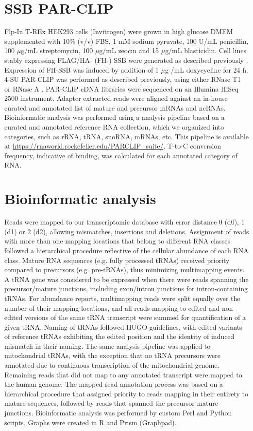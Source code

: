\documentclass[12pt]{rockefeller}
\begin{document}
\section{SSB PAR-CLIP}\label{parclip_method}
Flp-In T-REx HEK293 cells (Invitrogen) were grown in high glucose DMEM supplemented with 10\% (v/v) FBS, 1 mM sodium pyruvate, 100 U/mL penicillin, 100 $\mu$g/mL streptomycin, 100 $\mu$g/mL zeocin and 15 $\mu$g/mL blasticidin. Cell lines stably expressing FLAG/HA- (FH-) SSB were generated as described previously \cite{Spitzer:2013fk}. Expression of FH-SSB was induced by addition of 1 $\mu$g /mL doxycycline for 24 h. 4-SU PAR-CLIP was performed as described previously, using either RNase T1 or RNase A \cite{Garzia:2016cx}. PAR-CLIP cDNA libraries were sequenced on an Illumina HiSeq 2500 instrument. Adapter extracted reads were aligned against an in-house curated and annotated list of mature and precursor mRNAs and ncRNAs. Bioinformatic analysis was performed using a analysis pipeline based on a curated and annotated reference RNA collection, which we organized into categories, such as rRNA, tRNA, snoRNA, mRNAs, etc. This pipeline is available at \url{https://rnaworld.rockefeller.edu/PARCLIP_suite/}. T-to-C conversion frequency, indicative of binding, was calculated for each annotated category of RNA. 

\section{Bioinformatic analysis}
Reads were mapped to our transcriptomic database with error distance 0 (d0), 1 (d1) or 2 (d2), allowing mismatches, insertions and deletions. Assignment of reads with more than one mapping locations that belong to different RNA classes followed a hierarchical procedure reflective of the cellular abundance of each RNA class. Mature RNA sequences (e.g. fully processed tRNAs) received priority compared to precursors (e.g. pre-tRNAs), thus minimizing multimapping events. A tRNA gene was considered to be expressed when there were reads spanning the precursor/mature junctions, including exon/intron junctions for intron-containing tRNAs. For abundance reports, multimapping reads were split equally over the number of their mapping locations, and all reads mapping to edited and non-edited versions of the same tRNA transcript were summed for quantification of a given tRNA. Naming of tRNAs followed HUGO guidelines, with edited variants of reference tRNAs exhibiting the edited position and the identity of induced mismatch in their naming. The same analysis pipeline was applied to mitochondrial tRNAs, with the exception that no tRNA precursors were annotated due to continuous transcription of the mitochondrial genome. Remaining reads that did not map to any annotated transcript were mapped to the human genome. The mapped read annotation process was based on a hierarchical procedure that assigned priority to reads mapping in their entirety to mature sequences, followed by reads that spanned the precursor-mature junctions. Bioinformatic analysis was performed by custom Perl and Python scripts. Graphs were created in R and Prism (Graphpad).
\end{document}
